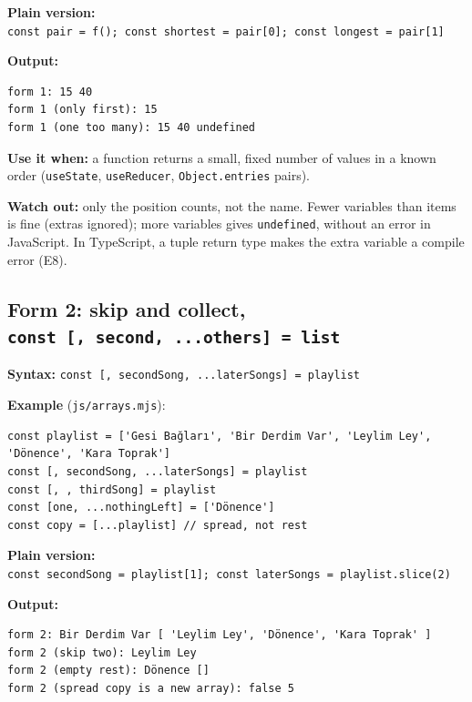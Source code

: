 \documentclass[
  10pt,
]{article}
\begin{document}
\textbf{Plain version:}
\texttt{const\ pair\ =\ f();\ const\ shortest\ =\ pair{[}0{]\allowbreak{}};\ const\ longest\ =\ pair{[}1{]\allowbreak{}}}

\textbf{Output:}

\begin{verbatim}
form 1: 15 40
form 1 (only first): 15
form 1 (one too many): 15 40 undefined
\end{verbatim}

\textbf{Use it when:} a function returns a small, fixed number of values
in a known order (\texttt{useState}, \texttt{useReducer},
\texttt{Object.\allowbreak{}entries} pairs).

\textbf{Watch out:} only the position counts, not the name. Fewer
variables than items is fine (extras ignored); more variables gives
\texttt{undefined}, without an error in JavaScript. In TypeScript, a
tuple return type makes the extra variable a compile error (E8).

\hypertarget{form-2-skip-and-collect-const--second-others--list}{%
\subsection{\texorpdfstring{Form 2: skip and collect,
\texttt{const\ {[},\ second,\ .\allowbreak{}.\allowbreak{}.\allowbreak{}others{]\allowbreak{}}\ =\ list}}{Form 2: skip and collect, }}\label{form-2-skip-and-collect-const--second-others--list}}

\textbf{Syntax:}
\texttt{const\ {[},\ secondSong,\ .\allowbreak{}.\allowbreak{}.\allowbreak{}laterSongs{]\allowbreak{}}\ =\ playlist}

\textbf{Example} (\texttt{js/\allowbreak{}arrays.\allowbreak{}mjs}):

\begin{verbatim}
const playlist = ['Gesi Bağları', 'Bir Derdim Var', 'Leylim Ley', 'Dönence', 'Kara Toprak']
const [, secondSong, ...laterSongs] = playlist
const [, , thirdSong] = playlist
const [one, ...nothingLeft] = ['Dönence']
const copy = [...playlist] // spread, not rest
\end{verbatim}

\textbf{Plain version:}
\texttt{const\ secondSong\ =\ playlist{[}1{]\allowbreak{}};\ const\ laterSongs\ =\ playlist.\allowbreak{}slice(2)}

\textbf{Output:}

\begin{verbatim}
form 2: Bir Derdim Var [ 'Leylim Ley', 'Dönence', 'Kara Toprak' ]
form 2 (skip two): Leylim Ley
form 2 (empty rest): Dönence []
form 2 (spread copy is a new array): false 5
\end{verbatim}
\end{document}
